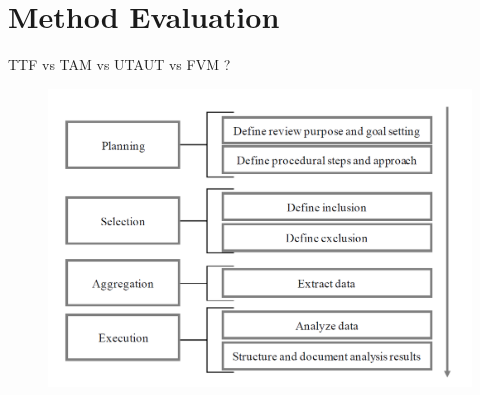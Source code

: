 \section{Method Evaluation}

TTF vs TAM vs UTAUT vs FVM ?

\begin{figure}[ht]
    \includegraphics[width=0.8\linewidth]{images/methodology/litSearc.png}\centering
    \caption{\cite{Okoli2010AResearch}}
\end{figure}
